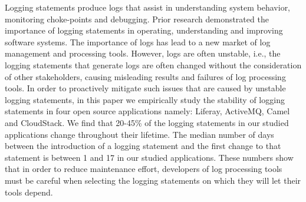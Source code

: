 Logging statements produce logs that assist in understanding system behavior, monitoring choke-points and debugging. Prior research demonstrated the importance of logging statements in operating, understanding and improving software systems. The importance of logs has lead to a new market of log management and processing tools. However, logs are often unstable, i.e., the logging statements that generate logs are often changed without the consideration of other stakeholders, causing misleading results and failures of log processing tools. In order to proactively mitigate such issues that are caused by unstable logging statements, in this paper we empirically study the stability of logging statements in four open source applications namely: Liferay, ActiveMQ, Camel and CloudStack. We find that 20-45\% of the logging statements in our studied applications change throughout their lifetime. The median number of days between the introduction of a logging statement and the first change to that statement is between 1 and 17 in our studied applications. These numbers show that in order to reduce maintenance effort, developers of log processing tools must be careful when selecting the logging statements on which they will let their tools depend.

